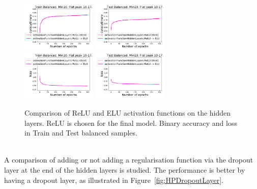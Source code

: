 \begin{figure}[!htb]
\centering
\includegraphics[width=0.32\textwidth]{plots/plot_01_1_overlay_graph_accuracyBinary_Train_ActivationFunctionHiddenLayers.pdf}
\includegraphics[width=0.32\textwidth]{plots/plot_01_1_overlay_graph_accuracyBinary_Test_ActivationFunctionHiddenLayers.pdf}\\
\includegraphics[width=0.32\textwidth]{plots/plot_01_1_overlay_graph_loss_Train_ActivationFunctionHiddenLayers.pdf}
\includegraphics[width=0.32\textwidth]{plots/plot_01_1_overlay_graph_loss_Test_ActivationFunctionHiddenLayers.pdf}\\
\caption{Comparison of ReLU and ELU activation functions on the hidden layers. ReLU is chosen for the final model. Binary accuracy and loss in Train and Test balanced samples.}
\label{fig:HPActivationFunctionHiddenLayers}
\end{figure}

\ \\A comparison of adding or not adding a regularisation function via the dropout layer at the end of the hidden layers is studied. The performance is better by having a dropout layer, as illustrated in Figure~\ref{fig:HPDropoutLayer}.

